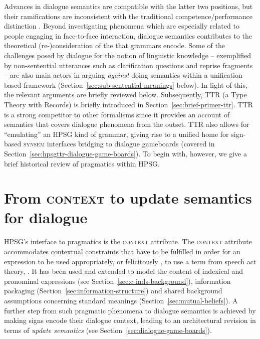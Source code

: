 \documentclass[output=paper]{langsci/langscibook}
\begin{document}
Advances in dialogue semantics are compatible with the latter two positions, but their ramifications are inconsistent with the traditional competence/performance distinction \citep{Ginzburg:Poesio:2016,Kempson:Cann:Gregoromichelaki:Chatzikyriakidis:2016}. 
%
Beyond investigating phenomena which are especially related to people engaging in face-to-face interaction, dialogue semantics contributes to the theoretical (re-)consideration of the  that grammars encode.
%
Some of the challenges posed by dialogue for the notion of linguistic knowledge -- exemplified by non-sentential utterances such as clarification questions and reprise fragments \citep{Fernandez:Ginzburg:2002,Fernandez:Ginzburg:Lappin:2007} -- are also main actors in arguing \emph{against} doing semantics within a unification-based framework (Section~\ref{sec:sub-sentential-meanings} below).
%
In light of this, the relevant arguments are briefly reviewed below.
%
Subsequently, TTR (a Type Theory with Records) is briefly introduced in Section~\ref{sec:brief-primer-ttr}. TTR is a strong competitor to other formalisms since it provides an account of semantics that covers dialogue phenomena from the outset.
%
TTR also allows for \enquote{emulating} an HPSG kind of grammar, giving rise to a unified home for sign-based \textsc{synsem} interfaces bridging to dialogue gameboards (covered in Section~\ref{sec:hpsgttr-dialogue-game-boards}).
%
To begin with, however, we give a brief historical review of pragmatics within HPSG.







\section{From \textsc{context} to update semantics for dialogue}
\label{sec:history}

HPSG's interface to pragmatics is the \textsc{context} attribute. 
%
The \textsc{context} attribute accommodates contextual constraints that have to be fulfilled in order for an expression to be used appropriately, or felicitously \citep{Austin:1962}, to use a term from speech act theory, \citep[p.~27]{Pollard:Sag:1994}.
%
It has been used and extended to model the content of indexical and pronominal expressions (see Section~\ref{sec:c-inds-background}), information packaging (Section~\ref{sec:information-structure}) and shared background assumptions concerning standard meanings (Section~\ref{sec:mutual-beliefs}).
%
A further step from such pragmatic phenomena to dialogue semantics is achieved  by making signs encode their dialogue context, leading to an architectural revision in terms of \emph{update semantics} (see Section~\ref{sec:dialogue-game-boards}).
\end{document}
